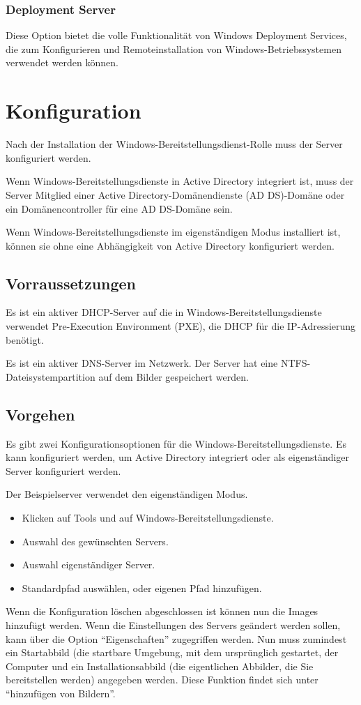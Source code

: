\documentclass[a4paper,11pt]{article}
\begin{document}
\subsubsection{Deployment Server}
Diese Option bietet die volle Funktionalität von Windows Deployment Services, die zum Konfigurieren und Remoteinstallation von Windows-Betriebssystemen verwendet werden können. 

\section{Konfiguration}
Nach der Installation der Windows-Bereitstellungsdienst-Rolle muss der Server konfiguriert werden. 

Wenn Windows-Bereitstellungsdienste in Active Directory integriert ist, muss der Server Mitglied einer Active Directory-Domänendienste (AD DS)-Domäne oder ein Domänencontroller für eine AD DS-Domäne sein. 

Wenn Windows-Bereitstellungsdienste im eigenständigen Modus installiert ist, können sie ohne eine Abhängigkeit von Active Directory konfiguriert werden.

\subsection{Vorraussetzungen}
Es ist ein aktiver DHCP-Server auf die in Windows-Bereitstellungsdienste verwendet Pre-Execution Environment (PXE), die DHCP für die IP-Adressierung benötigt.

Es ist ein aktiver DNS-Server im Netzwerk. Der Server hat eine NTFS-Dateisystempartition auf dem Bilder gespeichert werden.

\subsection{Vorgehen}
Es gibt zwei Konfigurationsoptionen für die Windows-Bereitstellungsdienste. 
Es kann konfiguriert werden, um Active Directory integriert oder als eigenständiger Server konfiguriert werden.

Der Beispielserver verwendet den eigenst\"andigen Modus.
\begin{itemize}
 \item Klicken auf Tools und auf Windows-Bereitstellungsdienste.
 \item Auswahl des gew\"unschten Servers.
 \item Auswahl eigenst\"andiger Server.
 \item Standardpfad ausw\"ahlen, oder eigenen Pfad hinzufügen.
\end{itemize}

Wenn die Konfiguration löschen abgeschlossen ist k\"onnen nun die Images hinzufügt werden.
Wenn die Einstellungen des Servers geändert werden sollen, kann \"uber die Option ``Eigenschaften'' zugegriffen werden.
Nun muss zumindest ein Startabbild (die startbare Umgebung, mit dem ursprünglich gestartet, der Computer und ein Installationsabbild (die eigentlichen Abbilder, die Sie bereitstellen werden) angegeben werden.
Diese Funktion findet sich unter ``hinzufügen von Bildern''.
\end{document}
